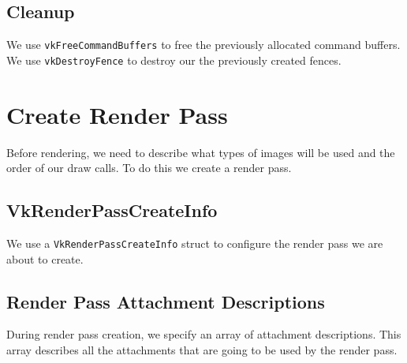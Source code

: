 \begin{minipage}{\linewidth}{\noindent}
    
\end{minipage}

\subsection{Cleanup}

We use \texttt{vkFreeCommandBuffers} to free the previously allocated command buffers.
We use \texttt{vkDestroyFence} to destroy our the previously created fences.

\section{Create Render Pass}

Before rendering, we need to describe what types of images will be used and the
order of our draw calls.
To do this we create a render pass.

\begin{minipage}{\linewidth}{\noindent}
    
\end{minipage}

\subsection{VkRenderPassCreateInfo}

We use a \texttt{VkRenderPassCreateInfo} struct to configure the render pass we
are about to create.

\begin{minipage}{\linewidth}{\noindent}
    
\end{minipage}

\subsection{Render Pass Attachment Descriptions}

During render pass creation, we specify an array of attachment descriptions.
This array describes all the attachments that are going to be used by the
render pass.

